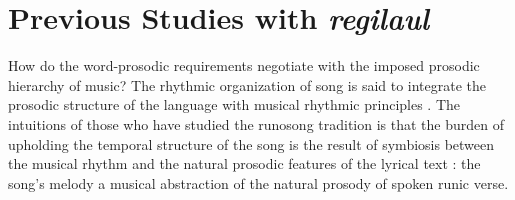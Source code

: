 

\section{Previous Studies with {\it regilaul}}
How do the word-prosodic requirements negotiate with the imposed prosodic hierarchy of music? The rhythmic organization of song is said to integrate the prosodic structure of the language with musical rhythmic principles \citep{palmer1992}. The intuitions of those who have studied the runosong tradition is that the burden of upholding the temporal structure of the song is the result of symbiosis between the musical rhythm and the natural prosodic features of the lyrical text \citep{ross1992, tampere1934}: the song's melody a musical abstraction of the natural prosody of spoken runic verse.





%
% 





% 
%

